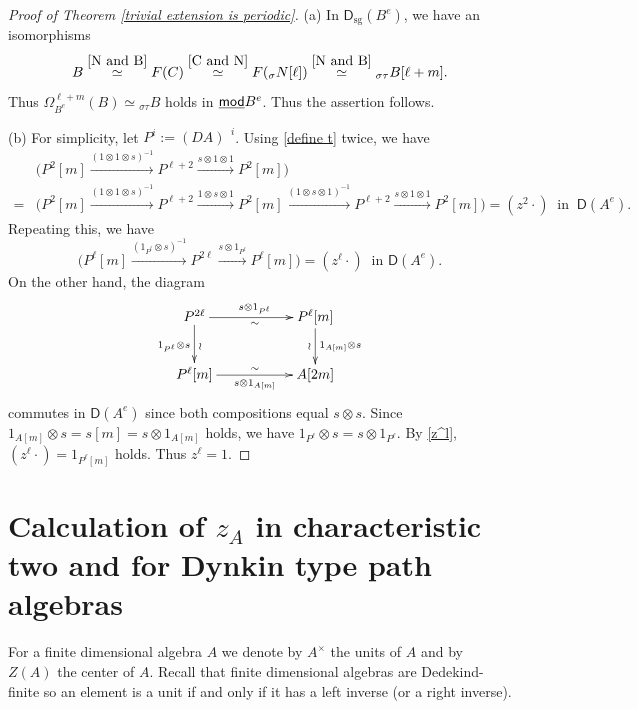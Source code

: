 \documentclass[a4paper,reqno,11pt]{amsart}
\theoremstyle{definition}
\newcommand{\DDD}{\mathsf{D}}
\newcommand{\sg}{\operatorname{sg}\nolimits}
\newcommand{\Lotimes}{\mathop{\stackrel{\mathbf{L}}{\otimes}}\nolimits}
\numberwithin{equation}{section}
\begin{document}
\begin{proof}[Proof of Theorem \ref{trivial extension is periodic}]
(a) In $\DDD_{\sg}(B^e)$, we have an isomorphisms
\[B\stackrel{\ref{N and B}}{\simeq}F(C)\stackrel{\ref{C and N}}{\simeq}F({}_\sigma N[\ell])\stackrel{\ref{N and B}}{\simeq}{}_{\sigma\tau}B[\ell+m].\]
Thus $\Omega^{\ell+m}_{B^e}(B)\simeq {}_{\sigma\tau}B$ holds in $\underline{\mod}B^e$. Thus the assertion follows.

(b) For simplicity, let $P^i:=(DA)^{\Lotimes i}$. Using \eqref{define t} twice, we have
\begin{align*}
&\Big(P^2[m]\xrightarrow{(1\otimes1\otimes s)^{-1}}P^{\ell+2}\xrightarrow{s\otimes1\otimes 1}P^2[m]\Big)\\
=&\Big(P^2[m]\xrightarrow{(1\otimes1\otimes s)^{-1}}P^{\ell+2}\xrightarrow{1\otimes s\otimes 1}P^2[m]\xrightarrow{(1\otimes s\otimes 1)^{-1}}P^{\ell+2}\xrightarrow{s\otimes1\otimes 1}P^2[m]\Big)=(z^2\cdot)\ \mbox{ in }\ \DDD(A^e).
\end{align*}
Repeating this, we have
\begin{equation}\label{z^l}
\Big(P^\ell[m]\xrightarrow{(1_{P^\ell}\otimes s)^{-1}}P^{2\ell}\xrightarrow{s\otimes1_{P^\ell}}P^\ell[m]\Big)=(z^\ell\cdot)\ \mbox{ in }\DDD(A^e).
\end{equation}
On the other hand, the diagram
\[\xymatrix{
P^{2\ell}\ar[d]_{1_{P^\ell}\otimes s}^\wr\ar[rr]^{s\otimes 
1_{P^\ell}}_\sim&&P^{\ell}[m]\ar[d]^{1_{A[m]}\otimes s}_\wr\\
P^{\ell}[m]\ar[rr]_{s\otimes 1_{A[m]}}^\sim&&A[2m]
}\]
commutes in $\DDD(A^e)$ since both compositions equal $s\otimes s$. Since $1_{A[m]}\otimes s=s[m]=s\otimes1_{A[m]}$ holds, we have $1_{P^\ell}\otimes s=s\otimes 1_{P^\ell}$.
By \eqref{z^l}, $(z^\ell\cdot)=1_{P^\ell[m]}$ holds. Thus $z^\ell=1$.
\end{proof}

\section{Calculation of $z_A$ in characteristic two and for Dynkin type path algebras}

For a finite dimensional algebra $A$ we denote by $A^\times$ the units of $A$ and by $Z(A)$ the center of $A$. Recall that finite dimensional algebras are Dedekind-finite so an element is a unit if and only if it has a left inverse (or a right inverse).
\end{document}

